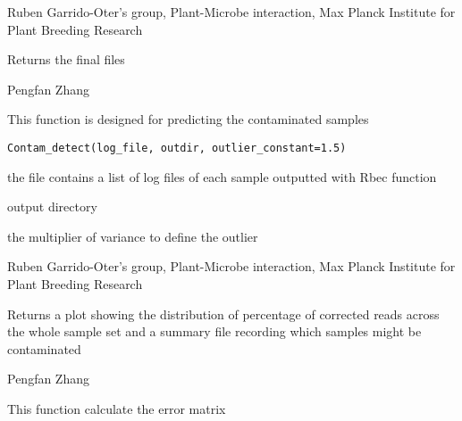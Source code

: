 \documentclass[a4paper]{book}
\begin{document}
%
\begin{Details}\relax
Ruben Garrido-Oter's group, Plant-Microbe interaction, Max Planck Institute for Plant Breeding Research
\end{Details}
%
\begin{Value}
Returns the final files
\end{Value}
%
\begin{Author}\relax
Pengfan Zhang
\end{Author}
%
\begin{Description}\relax
This function is designed for predicting the contaminated samples
\end{Description}
%
\begin{Usage}
\begin{verbatim}
Contam_detect(log_file, outdir, outlier_constant=1.5)
\end{verbatim}
\end{Usage}
%
\begin{Arguments}
\begin{ldescription}
\item[\code{log\_file}] the file contains a list of log files of each sample outputted with Rbec function

\item[\code{outdir}] output directory

\item[\code{outlier\_constant}] the multiplier of variance to define the outlier
\end{ldescription}
\end{Arguments}
%
\begin{Details}\relax
Ruben Garrido-Oter's group, Plant-Microbe interaction, Max Planck Institute for Plant Breeding Research
\end{Details}
%
\begin{Value}
Returns a plot showing the distribution of percentage of corrected reads across the whole sample set and a summary file recording which samples might be contaminated
\end{Value}
%
\begin{Author}\relax
Pengfan Zhang
\end{Author}
%
\begin{Description}\relax
This function calculate the error matrix
\end{Description}
\end{document}
